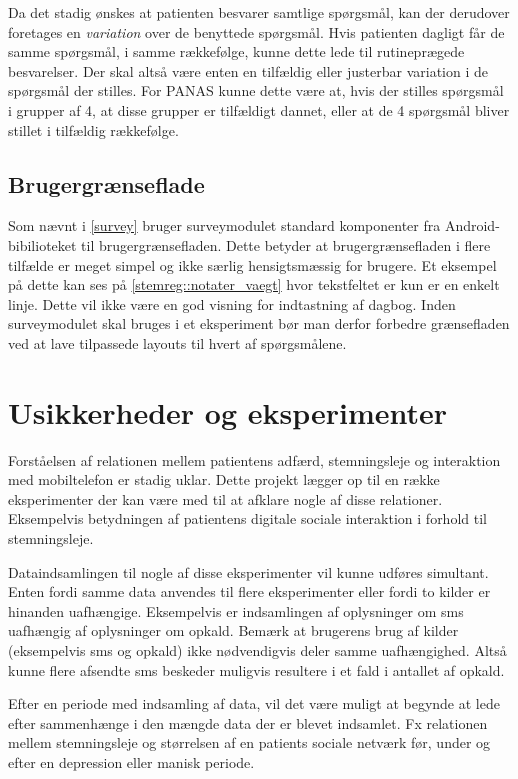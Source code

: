 Da det stadig ønskes at patienten besvarer samtlige spørgsmål, kan der derudover foretages en \emph{variation} over de benyttede spørgsmål.
Hvis patienten dagligt får de samme spørgsmål, i samme rækkefølge, kunne dette lede til rutineprægede besvarelser.
Der skal altså være enten en tilfældig eller justerbar variation i de spørgsmål der stilles.
For PANAS kunne dette være at, hvis der stilles spørgsmål i grupper af 4, at disse grupper er tilfældigt dannet, eller at de 4 spørgsmål bliver stillet i tilfældig rækkefølge.

\subsection{Brugergrænseflade}
Som nævnt i \cref{survey} bruger surveymodulet standard komponenter fra Android-bibilioteket til brugergrænsefladen.
Dette betyder at brugergrænsefladen i flere tilfælde er meget simpel og ikke særlig hensigtsmæssig for brugere.
Et eksempel på dette kan ses på \cref{stemreg::notater_vaegt} hvor tekstfeltet er kun er en enkelt linje.
Dette vil ikke være en god visning for indtastning af dagbog.
Inden surveymodulet skal bruges i et eksperiment bør man derfor forbedre grænsefladen ved at lave tilpassede layouts til hvert af spørgsmålene.


\section{Usikkerheder og eksperimenter}\label{refleksion:usikkerhed}
Forståelsen af relationen mellem patientens adfærd, stemningsleje og interaktion med mobiltelefon er stadig uklar.
Dette projekt lægger op til en række eksperimenter der kan være med til at afklare nogle af disse relationer.
Eksempelvis betydningen af patientens digitale sociale interaktion i forhold til stemningsleje.

Dataindsamlingen til nogle af disse eksperimenter vil kunne udføres simultant.
Enten fordi samme data anvendes til flere eksperimenter eller fordi to kilder er hinanden uafhængige.
Eksempelvis er indsamlingen af oplysninger om sms uafhængig af oplysninger om opkald.
Bemærk at brugerens brug af kilder (eksempelvis sms og opkald) ikke nødvendigvis deler samme uafhængighed.
Altså kunne flere afsendte sms beskeder muligvis resultere i et fald i antallet af opkald.

Efter en periode med indsamling af data, vil det være muligt at begynde at lede efter sammenhænge i den mængde data der er blevet indsamlet.
Fx relationen mellem stemningsleje og størrelsen af en patients sociale netværk før, under og efter en depression eller manisk periode.

